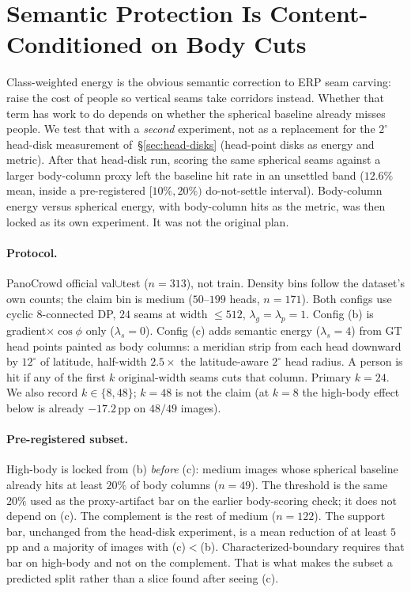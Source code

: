 
\section{Semantic Protection Is Content-Conditioned on Body Cuts}
\label{sec:body-boundary}

Class-weighted energy is the obvious semantic correction to ERP seam
carving: raise the cost of people so vertical seams take corridors
instead. Whether that term has work to do depends on whether the
spherical baseline already misses people. We test that with a
\emph{second} experiment, not as a replacement for the $2^\circ$ head-disk
measurement of~\S\ref{sec:head-disks} (head-point disks as energy and
metric). After that head-disk run, scoring the same spherical seams
against a larger body-column proxy left the baseline hit rate in an
unsettled band ($12.6\%$ mean, inside a pre-registered $[10\%,20\%)$
do-not-settle interval). Body-column energy versus spherical energy,
with body-column hits as the metric, was then locked as its own
experiment. It was not the original plan.

\paragraph{Protocol.}
PanoCrowd official val$\cup$test ($n=313$), not train. Density bins follow
the dataset's own counts; the claim bin is medium ($50$--$199$ heads,
$n=171$). Both configs use cyclic $8$-connected DP, $24$ seams at width
$\le 512$, $\lambda_g=\lambda_p=1$. Config (b) is gradient$\times\cos\phi$
only ($\lambda_s=0$). Config (c) adds semantic energy ($\lambda_s=4$) from
GT head points painted as body columns: a meridian strip from each head
downward by $12^\circ$ of latitude, half-width $2.5\times$ the
latitude-aware $2^\circ$ head radius. A person is hit if any of the first
$k$ original-width seams cuts that column. Primary $k=24$. We also
record $k\in\{8,48\}$; $k=48$ is not the claim (at $k=8$ the high-body
effect below is already $-17.2$\,pp on $48/49$ images).

\paragraph{Pre-registered subset.}
High-body is locked from (b) \emph{before} (c): medium images whose
spherical baseline already hits at least $20\%$ of body columns
($n=49$). The threshold is the same $20\%$ used as the proxy-artifact
bar on the earlier body-scoring check; it does not depend on (c). The
complement is the rest of medium ($n=122$). The support bar, unchanged
from the head-disk experiment, is a mean reduction of at least $5$\,pp
and a majority of images with (c)$<$(b). Characterized-boundary requires
that bar on high-body and not on the complement. That is what makes the
subset a predicted split rather than a slice found after seeing (c).

